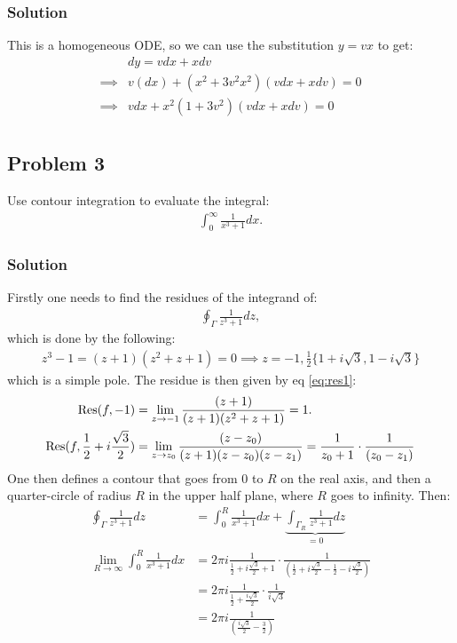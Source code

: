 \subsubsection*{Solution}
This is a homogeneous ODE, so we can use the substitution $y = vx$ to get:
\begin{align*}
    &dy = vdx + xdv\\
    \implies& v(dx) + (x^2 + 3v^2x^2)(vdx + xdv) = 0\\
    \implies& vdx + x^2(1 + 3v^2)(vdx + xdv) = 0\\
\end{align*}

\subsection*{Problem 3}
Use contour integration to evaluate the integral:
\begin{align*}
    \int_{0}^\infty \frac{1}{x^3 + 1}dx.
\end{align*}

\subsubsection*{Solution}
Firstly one needs to find the residues of the integrand of:
\begin{align*}
    \oint_\Gamma \frac{1}{z^3 + 1}dz,
\end{align*}which is done by the following:
\begin{align*}
    z^3 - 1= (z+ 1)(z^2+z+1) = 0\implies z = -1, \frac{1}{2}\{1 + i\sqrt{3}, 1- i\sqrt{3}\}
\end{align*}which is a simple pole. The residue is then given by eq \eqref{eq:res1}:
\begin{align*}
    \text{Res}(f,-1) &= \lim_{z\to-1}\frac{(z+1)}{(z+1)(z^2 + z + 1)} = 1.\\
    \text{Res}(f,\frac{1}{2} + i\frac{\sqrt{3}}{2})&=\lim_{z\to z_0}\frac{(z - z_0)}{(z+1)(z - z_0)(z -z_1)} = \frac{1}{z_0 + 1}\cdot\frac{1}{(z_0-z_1)}
\end{align*}One then defines a contour that goes from $0$ to $R$ on the real axis, and then a quarter-circle of radius $R$ in the upper half plane, where $R$ goes to infinity. Then:
\begin{align*}
    \oint_\Gamma\frac{1}{z^3 + 1}dz &= \int_{0}^R\frac{1}{x^3 + 1}dx + \underbrace{\int_{\Gamma_R}\frac{1}{z^3 + 1}dz}_{ = 0}\\
    \lim_{R\to\infty}\int_0^R\frac{1}{x^3 + 1}dx &= 2\pi i \frac{1}{\frac{1}{2} + i\frac{\sqrt{3}}{2} + 1}\cdot\frac{1}{(\frac{1}{2} + i\frac{\sqrt{3}}{2}-\frac{1}{2} - i\frac{\sqrt{3}}{2})}\\
    &= 2\pi i\frac{1}{\frac{1}{2} + \frac{i\sqrt{3}}{2}}\cdot\frac{1}{i\sqrt{3}}\\
    &=2\pi i\frac{1}{(\frac{i\sqrt{3}}{2} - \frac{3}{2})}
\end{align*}

